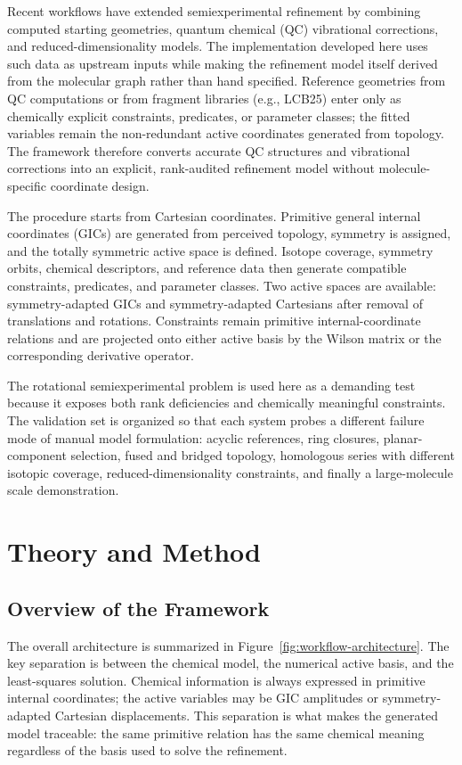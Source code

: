 \documentclass[aip,jcp,reprint,longbibliography,floatfix]{revtex4-2}
\begin{document}
Recent workflows have extended semiexperimental refinement by combining
computed starting geometries, quantum chemical (QC) vibrational corrections, and
reduced-dimensionality models.\cite{Mendolicchio2025FastDvib} The implementation
developed here uses such data as upstream inputs while making the refinement
model itself derived from the molecular graph rather than hand specified.
Reference geometries from QC computations or from fragment libraries (e.g.,
LCB25\cite{Lazzari2025LCB25}) enter only as chemically explicit constraints,
predicates, or parameter classes; the fitted variables remain the
non-redundant active coordinates generated from topology. The framework
therefore converts accurate QC structures and vibrational corrections into an
explicit, rank-audited refinement model without molecule-specific coordinate
design.

The procedure starts from Cartesian coordinates. Primitive general internal
coordinates (GICs) are generated from perceived topology, symmetry is assigned,
and the totally symmetric active space is defined. Isotope coverage, symmetry
orbits, chemical descriptors, and reference data then generate compatible
constraints, predicates, and parameter classes. Two active spaces are available:
symmetry-adapted GICs and symmetry-adapted Cartesians after removal of
translations and rotations. Constraints remain primitive internal-coordinate
relations and are projected onto either active basis by the Wilson matrix or the
corresponding derivative operator.\cite{Wilson1955}

The rotational semiexperimental problem is used here as a demanding test
because it exposes both rank deficiencies and chemically meaningful
constraints. The validation set is organized so that each system probes a
different failure mode of manual model formulation: acyclic references, ring
closures, planar-component selection, fused and bridged topology, homologous
series with different isotopic coverage, reduced-dimensionality constraints,
and finally a large-molecule scale demonstration.


\section{Theory and Method}

\subsection{Overview of the Framework}

The overall architecture is summarized in
Figure~\ref{fig:workflow-architecture}. The key separation is between the
chemical model, the numerical active basis, and the least-squares solution.
Chemical information is always expressed in primitive internal coordinates;
the active variables may be GIC amplitudes or symmetry-adapted Cartesian
displacements. This separation is what makes the generated model traceable:
the same primitive relation has the same chemical meaning regardless of the
basis used to solve the refinement.
\end{document}
